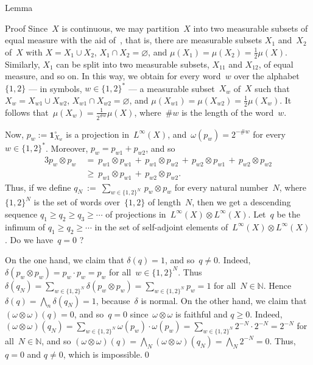 \documentclass[a]{subfiles}
\begin{document}
\begin{parsec}
\begin{point}{Lemma}
\begin{point}{Proof}
Since~$X$ is continuous,
we may partition~$X$ into two measurable
subsets of equal measure 
with the aid of~,
that is,
there are measurable subsets $X_{1}$ and~$X_{2}$
of~$X$ with $X=X_{1}\cup X_{2}$, $X_{1}\cap X_{2}=\varnothing$,
and
$\mu(X_{1})=\mu(X_{2})=\frac{1}{2}\mu(X)$.
Similarly, $X_{1}$ 
can be split into two measurable subsets, $X_{11}$ and $X_{12}$,
of equal measure, and so on.
In this way,
we obtain for every word~$w$ over the alphabet~$\{1,2\}$
--- in symbols, $w\in \{1,2\}^*$ ---
a measurable subset~$X_w$ of~$X$
such that $X_w = X_{w1}\cup X_{w2}$,
$X_{w1}\cap X_{w2}=\varnothing$,
and $\mu(X_{w1})=\mu(X_{w2})=\frac{1}{2}\mu(X_w)$.
It follows that~$\mu(X_w)=\frac{1}{2^{\#w}}\mu(X)$,
where~$\#w$ is the length of the word~$w$.

Now, $p_w := \mathbf{1}_{X_w}^\circ$ is a projection in~$L^\infty(X)$,
and~$\omega(p_w)=2^{-\#w}$
for every~$w\in\{1,2\}^*$.
Moreover, $p_w = p_{w1}+p_{w2}$,
and so
\begin{alignat*}{3}
p_w\otimes p_w 
\ &=\  
p_{w1}\otimes p_{w1} \,+\,
p_{w1}\otimes p_{w2} \,+\,
p_{w2}\otimes p_{w1} \,+\,
p_{w2}\otimes p_{w2}\\
\ &\geq\ 
p_{w1}\otimes p_{w1} \,+\,
p_{w2}\otimes p_{w2}.
\end{alignat*}
Thus, if we define 
$q_N\ :=\ \sum_{w\in \{1,2\}^N}\,p_w\otimes p_w$
for every natural number~$N$,
where~$\{1,2\}^N$ is the set of words over~$\{1,2\}$ of length~$N$,
then we get a descending sequence $q_1\geq q_2\geq q_3\geq \dotsb$
of projections in~$L^\infty(X)\otimes L^\infty(X)$.
Let~$q$ be the infimum of $q_1\geq q_2 \geq \dotsb$ 
in the set of self-adjoint elements of~$L^\infty(X)\otimes
L^\infty(X)$.
Do we have~$q=0$ ?

On the one hand,
we claim that $\delta(q)=1$, and so~$q\neq 0$.
Indeed,
$\delta(p_w\otimes p_w)=p_w\cdot p_w = p_w$
for all~$w\in \{1,2\}^N$.
Thus $\delta(q_N) = \sum_{w\in \{1,2\}^N}  \delta(p_w\otimes p_w)
= \sum_{w\in\{1,2\}^N} p_w=1$ for all~$N\in \mathbb{N}$.
Hence $\delta(q)=\bigwedge_n \delta(q_N) = 1$,
because~$\delta$ is normal.
On the other hand,
we claim that $(\omega\otimes \omega)(q)=0$,
and so~$q=0$ since~$\omega\otimes \omega$ is 
faithful and $q\geq 0$.
Indeed,
$(\omega\otimes\omega)(q_N)=
\sum_{w\in\{1,2\}^N} \omega(p_w)\cdot\omega(p_w)
= \sum_{w\in\{1,2\}^N} 2^{-N}\cdot 2^{-N} = 2^{-N}$
for all~$N\in \mathbb{N}$,
	and so $(\omega\otimes\omega)(q)
=\bigwedge_N (\omega\otimes\omega)(q_N) = \bigwedge_N 2^{-N}=0$.
Thus, $q=0$ and $q\neq 0$, which is impossible.\qed
\end{point}
\end{point}
\end{parsec}
\end{document}
